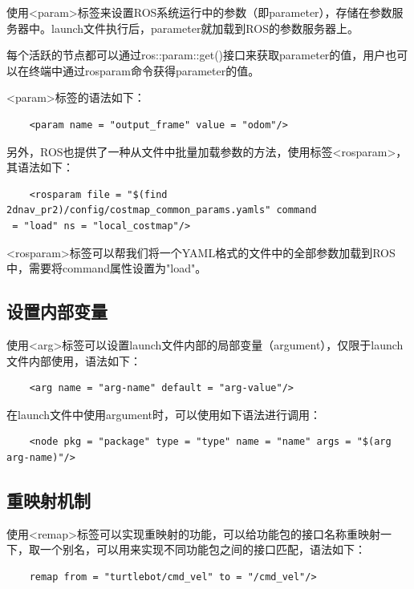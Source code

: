 \documentclass[9pt, oneside]{book}
\begin{document}
使用<param>标签来设置ROS系统运行中的参数（即parameter），存储在参数服务器中。launch文件执行后，parameter就加载到ROS的参数服务器上。

每个活跃的节点都可以通过ros::param::get()接口来获取parameter的值，用户也可以在终端中通过rosparam命令获得parameter的值。

<param>标签的语法如下：

\begin{verbatim}
    <param name = "output_frame" value = "odom"/>
\end{verbatim}

另外，ROS也提供了一种从文件中批量加载参数的方法，使用标签<rosparam>，其语法如下：

\begin{verbatim}
    <rosparam file = "$(find 2dnav_pr2)/config/costmap_common_params.yamls" command
 = "load" ns = "local_costmap"/>
\end{verbatim}

<rosparam>标签可以帮我们将一个YAML格式的文件中的全部参数加载到ROS中，需要将command属性设置为"load"。

\subsection{设置内部变量}

使用<arg>标签可以设置launch文件内部的局部变量（argument），仅限于launch文件内部使用，语法如下：

\begin{verbatim}
    <arg name = "arg-name" default = "arg-value"/>
\end{verbatim}

在launch文件中使用argument时，可以使用如下语法进行调用：

\begin{verbatim}
    <node pkg = "package" type = "type" name = "name" args = "$(arg arg-name)"/>
\end{verbatim}

\subsection{重映射机制}

使用<remap>标签可以实现重映射的功能，可以给功能包的接口名称重映射一下，取一个别名，可以用来实现不同功能包之间的接口匹配，语法如下：

\begin{verbatim}
    remap from = "turtlebot/cmd_vel" to = "/cmd_vel"/>
\end{verbatim}
\end{document}
